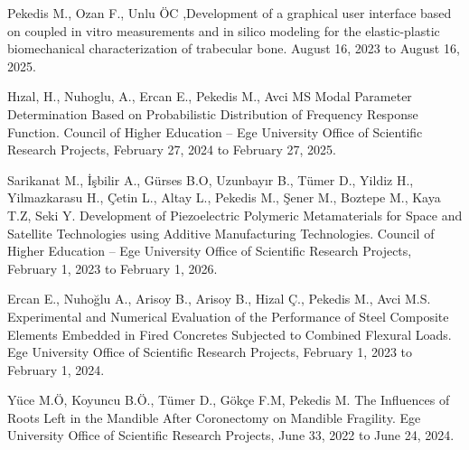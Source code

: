 \documentclass[10pt]{article}
\renewcommand{\section}[1]{\pagebreak[3]%
    \vspace{1.3\baselineskip}%
    \phantomsection\addcontentsline{toc}{section}{#1}%
    \noindent\llap{\scshape\smash{\parbox[t]{\marginparwidth}{\hyphenpenalty=10000\raggedright #1}}}%
    \vspace{-\baselineskip}\par}
\newcommand{\blankline}{\quad\pagebreak[3]}
\begin{document}
\section{Grants}

%
%
%


\begin{bibenum}



	\item Pekedis M., Ozan F., Unlu ÖC ,Development of a graphical user interface based on 	
		coupled in vitro measurements and in silico modeling for the elastic-plastic biomechanical
		characterization of trabecular bone. August 16, 2023 to August 16, 2025.


     \item Hızal, H., Nuhoglu, A., Ercan E., Pekedis M., Avci MS Modal Parameter Determination
     Based on Probabilistic Distribution of Frequency Response Function.  Council of 
     	Higher Education -- Ege University Office of Scientific Research Projects,
     	February 27, 2024 to February 27, 2025.	


     \item Sarikanat M., İşbilir A., Gürses B.O, Uzunbayır B., Tümer D., Yildiz H., 
     	Yilmazkarasu H., Çetin L., Altay L., Pekedis M., Şener M., Boztepe M., 
     	Kaya T.Z, Seki Y. Development of Piezoelectric Polymeric Metamaterials for Space
     	and Satellite Technologies using Additive Manufacturing Technologies. Council of 
     	Higher Education -- Ege University Office of Scientific Research Projects,
     	February 1, 2023 to February 1, 2026.	
				
     																
	\item Ercan E.,  Nuhoğlu A., Arisoy B., Arisoy B.,  Hizal Ç., Pekedis  M., Avci M.S.
		Experimental and Numerical Evaluation of the Performance of Steel Composite Elements
		Embedded in Fired Concretes Subjected to Combined Flexural Loads. 
		Ege University Office of Scientific Research Projects, February 1, 2023 to February 1, 2024.		
		
	\item Yüce M.Ö, Koyuncu B.Ö., Tümer D., Gökçe F.M, Pekedis M.
		The Influences of Roots Left in the Mandible After Coronectomy on Mandible Fragility.
		Ege University Office of Scientific Research Projects, June 33, 2022 to June 24, 2024.
	

\end{bibenum}
\end{document}

